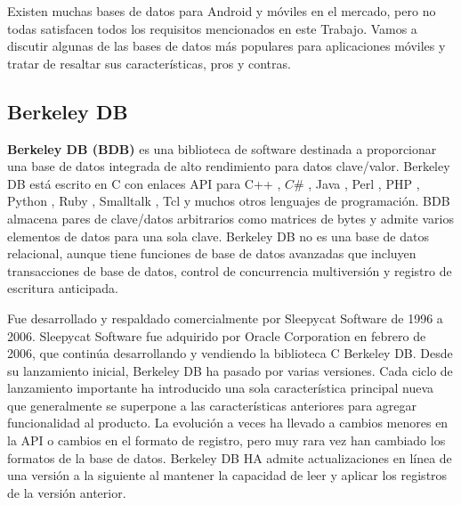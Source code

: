 Existen muchas bases de datos para Android y móviles en el mercado, pero no todas satisfacen todos los requisitos mencionados en este Trabajo. Vamos a discutir algunas de las bases de datos más populares para aplicaciones móviles y tratar de resaltar sus características, pros y contras.

\subsection{Berkeley DB}\label{chapter:introduction}






\textbf{ Berkeley DB (BDB)} es una biblioteca de software destinada a proporcionar una base de datos integrada de alto rendimiento para datos clave/valor. Berkeley DB está escrito en C con enlaces API para C++ , $C\#$ , Java , Perl , PHP , Python , Ruby , Smalltalk , Tcl y muchos otros lenguajes de programación. BDB almacena pares de clave/datos arbitrarios como matrices de bytes y admite varios elementos de datos para una sola clave. Berkeley DB no es una base de datos relacional, aunque tiene funciones de base de datos avanzadas que incluyen transacciones de base de datos, control de concurrencia multiversión y registro de escritura anticipada.

Fue desarrollado y respaldado comercialmente por Sleepycat Software de 1996 a 2006. Sleepycat Software fue adquirido por Oracle Corporation en febrero de 2006, que continúa desarrollando y vendiendo la biblioteca C Berkeley DB. Desde su lanzamiento inicial, Berkeley DB ha pasado por varias versiones. Cada ciclo de lanzamiento importante ha introducido una sola característica principal nueva que generalmente se superpone a las características anteriores para agregar funcionalidad al producto. La evolución a veces ha llevado a cambios menores en la API o cambios en el formato de registro, pero muy rara vez han cambiado los formatos de la base de datos. Berkeley DB HA admite actualizaciones en línea de una versión a la siguiente al mantener la capacidad de leer y aplicar los registros de la versión anterior.

